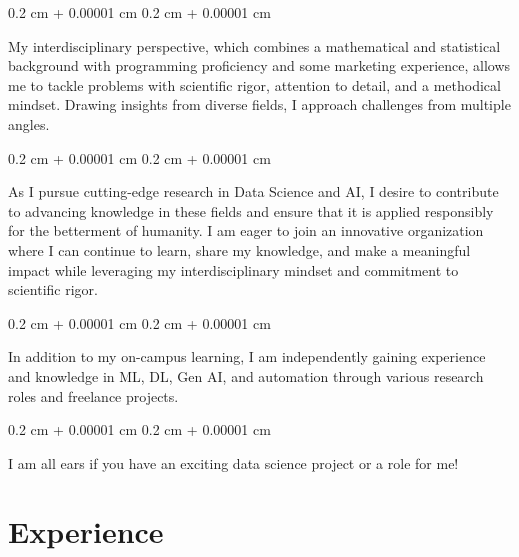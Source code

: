 \documentclass[10pt, letterpaper]{article}
\newenvironment{onecolentry}{
    \begin{adjustwidth}{
        0.2 cm + 0.00001 cm
    }{
        0.2 cm + 0.00001 cm
    }
}{
    \end{adjustwidth}
} %
\begin{document}
        \vspace{0.2 cm}

        \begin{onecolentry}
            My interdisciplinary perspective, which combines a mathematical and statistical background with programming proficiency and some marketing experience, allows me to tackle problems with scientific rigor, attention to detail, and a methodical mindset. Drawing insights from diverse fields, I approach challenges from multiple angles.
        \end{onecolentry}

        \vspace{0.2 cm}

        \begin{onecolentry}
            As I pursue cutting-edge research in Data Science and AI, I desire to contribute to advancing knowledge in these fields and ensure that it is applied responsibly for the betterment of humanity. I am eager to join an innovative organization where I can continue to learn, share my knowledge, and make a meaningful impact while leveraging my interdisciplinary mindset and commitment to scientific rigor.
        \end{onecolentry}

        \vspace{0.2 cm}

        \begin{onecolentry}
            In addition to my on-campus learning, I am independently gaining experience and knowledge in ML, DL, Gen AI, and automation through various research roles and freelance projects.
        \end{onecolentry}

        \vspace{0.2 cm}

        \begin{onecolentry}
            I am all ears if you have an exciting data science project or a role for me!
        \end{onecolentry}


    
    \section{Experience}
\end{document}

